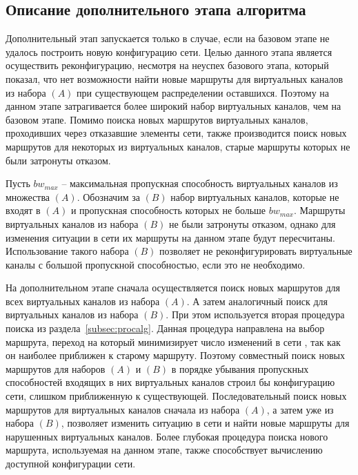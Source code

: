 \documentclass[12pt, a4paper]{article}
\begin{document}
\subsection{Описание дополнительного этапа алгоритма}
Дополнительный этап запускается только в случае, если на базовом этапе не удалось построить новую конфигурацию сети. Целью данного этапа является осуществить реконфигурацию, несмотря на неуспех базового этапа, который показал, что нет возможности найти новые маршруты для виртуальных каналов из набора $(A)$ при существующем распределении оставшихся. Поэтому на данном этапе затрагивается более широкий набор виртуальных каналов, чем на базовом этапе. Помимо поиска новых маршрутов виртуальных каналов, проходивших через отказавшие элементы сети, также производится поиск новых маршрутов для некоторых из виртуальных каналов, старые маршруты которых не были затронуты отказом.

Пусть $bw_{max}$ -- максимальная пропускная способность виртуальных каналов из множества $(A)$.
Обозначим за $(B)$ набор виртуальных каналов, которые не входят в $(A)$ и пропускная способность которых не больше $bw_{max}$. Маршруты виртуальных каналов из набора $(B)$ не были затронуты отказом, однако для изменения ситуации в сети их маршруты на данном этапе будут пересчитаны. Использование такого набора $(B)$ позволяет не реконфигурировать виртуальные каналы с большой пропускной способностью, если это не необходимо.

На дополнительном этапе сначала осуществляется поиск новых маршрутов для всех виртуальных каналов из набора $(A)$. А затем аналогичный поиск для виртуальных каналов из набора $(B)$. При этом используется вторая процедура поиска из раздела~\ref{subsec:procalg}. Данная процедура направлена на выбор маршрута, переход на который минимизирует число изменений в сети , так как он наиболее приближен к старому маршруту. Поэтому совместный поиск новых маршрутов для наборов $(A)$ и $(B)$ в порядке убывания пропускных способностей входящих в них виртуальных каналов строил бы конфигурацию сети, слишком приближенную к существующей. Последовательный поиск новых маршрутов для виртуальных каналов сначала из набора $(A)$, а затем уже из набора $(B)$, позволяет изменить ситуацию в сети и найти новые маршруты для нарушенных виртуальных каналов. Более глубокая процедура поиска нового маршрута, используемая на данном этапе, также способствует вычислению доступной конфигурации сети. 
\end{document}
